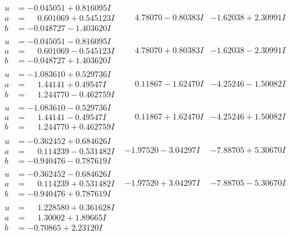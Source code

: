 \documentclass[1p]{elsarticle_modified}
\theoremstyle{definition}
\begin{document}
$$\begin{array}{c|c|c}
\begin{aligned}
u &= -0.045051 + 0.816095 I \\
a &= \phantom{-}0.601069 + 0.545123 I \\
b &= -0.048727 - 1.403620 I\end{aligned}
 & \phantom{-}4.78070 - 0.80383 I & -1.62038 + 2.30991 I \\ \hline\begin{aligned}
u &= -0.045051 - 0.816095 I \\
a &= \phantom{-}0.601069 - 0.545123 I \\
b &= -0.048727 + 1.403620 I\end{aligned}
 & \phantom{-}4.78070 + 0.80383 I & -1.62038 - 2.30991 I \\ \hline\begin{aligned}
u &= -1.083610 + 0.529736 I \\
a &= \phantom{-}1.44141 + 0.49547 I \\
b &= \phantom{-}1.244770 - 0.462759 I\end{aligned}
 & \phantom{-}0.11867 - 1.62470 I & -4.25246 - 1.50082 I \\ \hline\begin{aligned}
u &= -1.083610 - 0.529736 I \\
a &= \phantom{-}1.44141 - 0.49547 I \\
b &= \phantom{-}1.244770 + 0.462759 I\end{aligned}
 & \phantom{-}0.11867 + 1.62470 I & -4.25246 + 1.50082 I \\ \hline\begin{aligned}
u &= -0.362452 + 0.684626 I \\
a &= \phantom{-}0.114239 - 0.531482 I \\
b &= -0.940476 - 0.787619 I\end{aligned}
 & -1.97520 - 3.04297 I & -7.88705 + 5.30670 I \\ \hline\begin{aligned}
u &= -0.362452 - 0.684626 I \\
a &= \phantom{-}0.114239 + 0.531482 I \\
b &= -0.940476 + 0.787619 I\end{aligned}
 & -1.97520 + 3.04297 I & -7.88705 - 5.30670 I \\ \hline\begin{aligned}
u &= \phantom{-}1.228580 + 0.361628 I \\
a &= \phantom{-}1.30002 + 1.89665 I \\
b &= -0.70865 + 2.23120 I\end{aligned}

\end{array}$$
\end{document}

